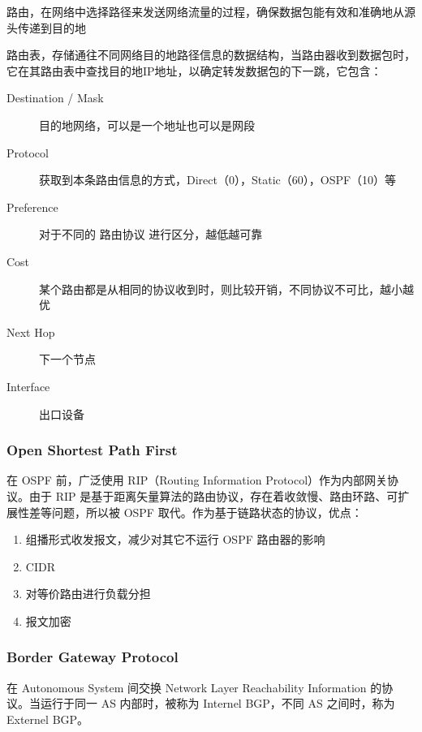 \documentclass[11pt,journal,compsoc]{IEEEtran}
\begin{document}
路由，在网络中选择路径来发送网络流量的过程，确保数据包能有效和准确地从源头传递到目的地

路由表，存储通往不同网络目的地路径信息的数据结构，当路由器收到数据包时，它在其路由表中查找目的地IP地址，以确定转发数据包的下一跳，它包含：

\begin{description}
    \item[Destination / Mask] 目的地网络，可以是一个地址也可以是网段

    \item[Protocol] 获取到本条路由信息的方式，Direct（0），Static（60），OSPF（10）等

    \item[Preference] 对于不同的 路由协议 进行区分，越低越可靠

    \item[Cost] 某个路由都是从相同的协议收到时，则比较开销，不同协议不可比，越小越优

    \item[Next Hop] 下一个节点

    \item[Interface] 出口设备
\end{description}


\subsubsection{Open Shortest Path First}

在 OSPF 前，广泛使用 RIP（Routing Information Protocol）作为内部网关协议。由于 RIP 是基于距离矢量算法的路由协议，存在着收敛慢、路由环路、可扩展性差等问题，所以被 OSPF 取代。作为基于链路状态的协议，优点：

\begin{enumerate}
    \item 组播形式收发报文，减少对其它不运行 OSPF 路由器的影响
    \item CIDR
    \item 对等价路由进行负载分担
    \item 报文加密
\end{enumerate}


\subsubsection{Border Gateway Protocol}

在 Autonomous System 间交换 Network Layer Reachability Information 的协议。当运行于同一 AS 内部时，被称为 Internel BGP，不同 AS 之间时，称为 Externel BGP。
\end{document}
